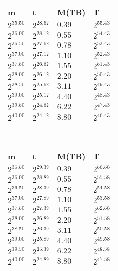 
 \ 
\begin{tabular}{llll}
m & t & M(TB) & T \\ \hline
$2^{35.50}$ & $2^{28.62}$ & $0.39$ & $2^{55.43}$ \\
$2^{36.00}$ & $2^{28.12}$ & $0.55$ & $2^{54.43}$ \\
$2^{36.50}$ & $2^{27.62}$ & $0.78$ & $2^{53.43}$ \\
$2^{37.00}$ & $2^{27.12}$ & $1.10$ & $2^{52.43}$ \\
$2^{37.50}$ & $2^{26.62}$ & $1.55$ & $2^{51.43}$ \\
$2^{38.00}$ & $2^{26.12}$ & $2.20$ & $2^{50.43}$ \\
$2^{38.50}$ & $2^{25.62}$ & $3.11$ & $2^{49.43}$ \\
$2^{39.00}$ & $2^{25.12}$ & $4.40$ & $2^{48.43}$ \\
$2^{39.50}$ & $2^{24.62}$ & $6.22$ & $2^{47.43}$ \\
$2^{40.00}$ & $2^{24.12}$ & $8.80$ & $2^{46.43}$ \\
\end{tabular}
 \ 
\begin{tabular}{llll}
m & t & M(TB) & T \\ \hline
$2^{35.50}$ & $2^{29.39}$ & $0.39$ & $2^{56.58}$ \\
$2^{36.00}$ & $2^{28.89}$ & $0.55$ & $2^{55.58}$ \\
$2^{36.50}$ & $2^{28.39}$ & $0.78$ & $2^{54.58}$ \\
$2^{37.00}$ & $2^{27.89}$ & $1.10$ & $2^{53.58}$ \\
$2^{37.50}$ & $2^{27.39}$ & $1.55$ & $2^{52.58}$ \\
$2^{38.00}$ & $2^{26.89}$ & $2.20$ & $2^{51.58}$ \\
$2^{38.50}$ & $2^{26.39}$ & $3.11$ & $2^{50.58}$ \\
$2^{39.00}$ & $2^{25.89}$ & $4.40$ & $2^{49.58}$ \\
$2^{39.50}$ & $2^{25.39}$ & $6.22$ & $2^{48.58}$ \\
$2^{40.00}$ & $2^{24.89}$ & $8.80$ & $2^{47.58}$ \\
\end{tabular}
 \ 
